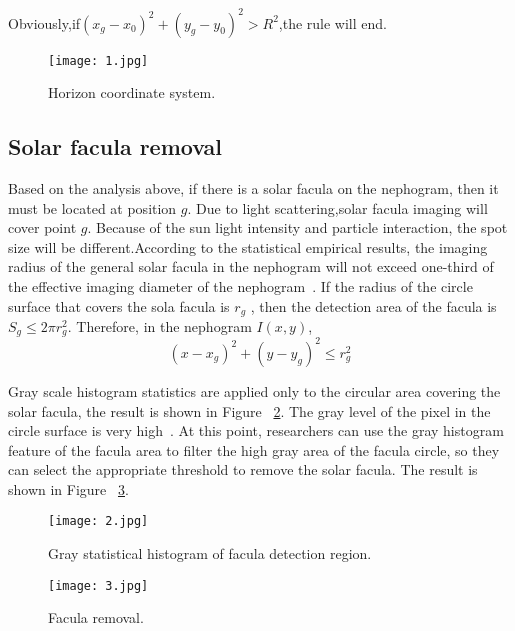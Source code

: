 \documentclass[10pt,twocolumn,letterpaper]{article}
\begin{document}
Obviously,if$ (x_g-x_0)^2+(y_g-y_0)^2>R^2$,the rule will end.
\begin{figure}[!htpb]
\begin{center}
   \texttt{[image: 1.jpg]}
\end{center}
   \caption{Horizon coordinate system.}
\label{fig:onecol}
\end{figure}
\subsection{Solar facula removal}
Based on the analysis above, if there is a solar facula on the nephogram, then it must be located at position $g$. Due to light scattering,solar facula imaging will cover point $g$. Because of the sun light intensity and particle interaction, the spot size will be different.According to the statistical empirical results, the imaging radius of the general solar facula in the nephogram will not exceed one-third of the effective imaging diameter of the nephogram~\cite{xiang2017very}. If the radius of the circle surface that covers the sola facula is $r_g$ , then the detection area of the facula is $S_g\leq 2\pi r_{g}^{2}$. Therefore, in the nephogram $I(x, y)$,
\begin{equation}
(x-x_g)^2+(y-y_g)^2\leq r_{g}^{2}
\end{equation}

Gray scale histogram statistics are applied only to the circular area covering the solar facula, the result is shown in Figure ~\ref{fig:twocol}. The gray level of the pixel in the circle surface is very high~\cite{Singh2008Edge}. At this point, researchers can use the gray histogram feature of the facula area to filter the high gray area of the facula circle, so they can select the appropriate threshold to remove the solar facula. The result is shown in Figure ~\ref{fig:threecol}.

\begin{figure}[!htpb]
\begin{center}
   \texttt{[image: 2.jpg]}
\end{center}
   \caption{Gray statistical histogram of facula detection region.}
\label{fig:twocol}
\end{figure}


\begin{figure}[!htpb]
\begin{center}
   \texttt{[image: 3.jpg]}
\end{center}
   \caption{ Facula removal.}
\label{fig:threecol}
\end{figure}

{\small


}
\end{document}
